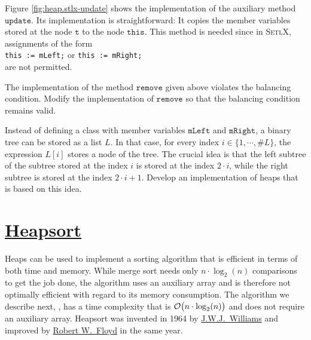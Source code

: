 \noindent 
Figure \ref{fig:heap.stlx-update} shows the implementation of the auxiliary method $\texttt{update}$.
Its implementation is straightforward: It copies the member variables stored at the node $\texttt{t}$
to the node $\texttt{this}$.  This method is needed since in \textsc{SetlX}, assignments of the form
\\[0.2cm]
\hspace*{1.3cm}
\texttt{this := mLeft;} \quad or \quad \texttt{this := mRight;}
\\[0.2cm]
are not permitted.


\exercise
The implementation of the method $\texttt{remove}$ given above violates the balancing condition.
Modify the implementation of $\texttt{remove}$ so that the balancing condition remains valid.

\exercise
Instead of defining a class with member variables $\texttt{mLeft}$ and $\texttt{mRight}$, a binary tree
can be stored as a list $L$.  In that case, for every index $i \in \{1, \cdots, \texttt{\#}L \}$,
the expression $L[i]$ stores a node of the tree.  The crucial idea is that the left subtree of the
subtree stored at the index $i$ is stored at the index $2 \cdot i$, while the right subtree is
stored at the index $2 \cdot i + 1$.  Develop an implementation of heaps that is based on this idea.

\section{\href{https://en.wikipedia.org/wiki/Heapsort}{Heapsort} \label{sec:heapsort}}
Heaps can be used to implement a sorting algorithm that is efficient in terms of both time and
memory. While merge sort needs only $n \cdot \log_2(n)$ comparisons to get the job done, the
algorithm uses an auxiliary array and is therefore not optimally efficient with regard to its memory
consumption.  The algorithm we describe next, , has
a time complexity that is $\mathcal{O}\bigl(n \cdot \log_2(n)\bigr)$ and does not require an auxiliary
array.  Heapsort was invented in 1964 by \href{https://en.wikipedia.org/wiki/J._W._J._Williams}{J.W.J.~Williams} and
improved by \href{https://en.wikipedia.org/wiki/Robert_W._Floyd}{Robert W.~Floyd} in the same year.

